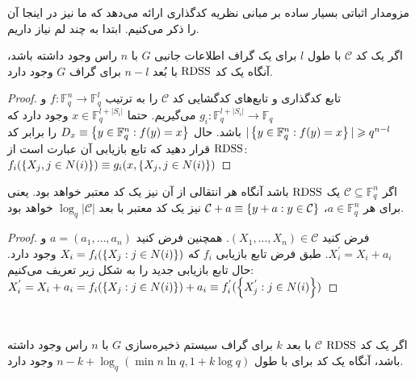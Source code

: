  مزومدار اثباتی بسیار ساده بر مبانی نظریه کدگذاری ارائه می‌دهد که ما نیز در اینجا آن را ذکر می‌کنیم. ابتدا به چند لم نیاز داریم.
 \begin{lemma}
 	\label{lemma:arya:lem2}
 	اگر یک کد
 	$\mathcal{C}$
 	با طول
 	$l$
 	برای یک گراف اطلاعات جانبی
 	$G$
 	با
 	$n$
 	راس وجود داشته باشد، آنگاه یک کد
 	$\mathrm{RDSS}$
 	با بُعد
 	$n - l$
 	برای گراف
 	$G$
 	وجود دارد.
 \end{lemma}
 \begin{proof}
 	تابع کدگذاری و تابع‌های کدگشایی کد
 	$\mathcal{C}$
 	را به ترتیب
 	$f: \mathbb{F}_q^n \rightarrow \mathbb{F}_q^l$
 	و
 	$g_i: \mathbb{F}_q^{l + |S_i|} \rightarrow \mathbb{F}_q$
 	می‌گیریم. حتما
 	$x \in \mathbb{F}_q^{l + |S_i|}$
 	وجود دارد که
 	$|\left\{ y \in \mathbb{F}_q^n: f(y) = x \right\}| \geqslant q^{n - l}$
 	باشد. حال
 	$D_x \equiv \left\{ y \in \mathbb{F}_q^n: f(y) = x \right\}$
  	را برابر کد
 	$\mathrm{RDSS}$
 	قرار دهید که تابع بازیابی آن عبارت است از:
 	$f_i(\left\{ X_j, j \in N(i) \right\}) \equiv g_i(x, \left\{ X_j, j \in N(i) \right\})$
 \end{proof}
 \begin{lemma}
 	\label{lemma:arya:lem4}
 	اگر
 	$\mathcal{C} \subseteq \mathbb{F}_q^n$
 	یک
 	$\mathrm{RDSS}$
 	باشد آنگاه هر انتقالی از آن نیز یک کد معتبر خواهد بود. یعنی برای هر
 	$a \in \mathbb{F}_q^n$،
 	$\mathcal{C} + a \equiv \left\{ y + a: y \in \mathcal{C} \right\}$
 	نیز یک کد معتبر با بعد
 	$\log_q |\mathcal{C}|$
 	خواهد بود.
 \end{lemma}
 \begin{proof}
 	فرض کنید
 	$(X_1, \ldots, X_n) \in \mathcal{C}$.
 	همچنین فرض کنید
 	$a = (a_1, \dots,  a_n)$
 	و
 	$X_i^{'} = X_i + a_i$.
 	طبق فرض تابع بازیابی
 	$f_i$
 	که
 	$X_i = f_i(\left\{ X_j: j \in N(i) \right\})$
 	وجود دارد. حال تابع بازیابی جدید را به شکل زیر تعریف می‌کنیم:
 	$X_i^{'} = X_i +a_i = f_i(\left\{ X_j: j \in N(i) \right\}) + a_i \equiv f_i^{'}(\left\{ X_j^{'}: j \in N(i) \right\})$
 \end{proof}
 ‍\begin{lemma}
 	\label{lemma:arya:lem3}
 	اگر یک کد
 	$\mathrm{RDSS}$ $\mathcal{C}$
 	با بعد
 	$k$
 	برای گراف سیستم ذخیره‌سازی
 	$G$
 	با
 	$n$
 	راس وجود داشته باشد، آنگاه یک کد برای
 	\icodg
 	با طول 
 	$n - k + \log_q(\min{n \ln q, 1 + k \log q})$
 	وجود دارد.
 \end{lemma}
